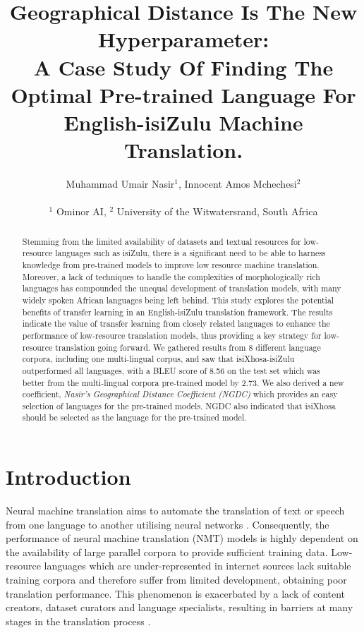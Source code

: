 \documentclass[11pt]{article}
\title{Geographical Distance Is The New Hyperparameter:\\ { A Case Study Of Finding The Optimal Pre-trained Language For English-isiZulu Machine Translation.}}
\author{\normalsize Muhammad Umair Nasir$^{1}$, Innocent Amos Mchechesi$^{2}$ \\\\
  \footnotesize
  $^{1}$ Ominor AI, $^{2}$ University of the Witwatersrand, South Africa}
\begin{document}
\maketitle
\begin{abstract}
Stemming from the limited availability of datasets and textual resources for low-resource languages such as isiZulu, there is a significant need to be able to harness knowledge from pre-trained models to improve low resource machine translation. Moreover, a lack of techniques to handle the complexities of morphologically rich languages has compounded the unequal development of translation models, with many widely spoken African languages being left behind. This study explores the potential benefits of transfer learning in an English-isiZulu translation framework. The results indicate the value of transfer learning from closely related languages to enhance the performance of low-resource translation models, thus providing a key strategy for low-resource translation going forward. We gathered results from 8 different language corpora, including one multi-lingual corpus, and saw that isiXhosa-isiZulu outperformed all languages, with a BLEU score of 8.56 on the test set which was better from the multi-lingual corpora pre-trained model by 2.73. We also derived a new coefficient, \emph{Nasir's Geographical Distance Coefficient (NGDC)} which provides an easy selection of languages for the pre-trained models. NGDC also indicated that isiXhosa should be selected as the language for the pre-trained model.
\end{abstract}

\section{Introduction}

Neural machine translation aims to automate the translation of text or speech from one language to another utilising neural networks \citep{nyoni2021low}. Consequently, the performance of neural machine translation (NMT) models is highly dependent on the availability of large parallel corpora to provide sufficient training data. Low-resource languages which are under-represented in internet sources lack suitable training corpora and therefore suffer from limited development, obtaining poor translation performance. This phenomenon is exacerbated by a lack of content creators, dataset curators and language specialists, resulting in barriers at many stages in the translation process \citep{lakew2020low,zoph2016transfer,sennrich2019revisiting}.
\end{document}
